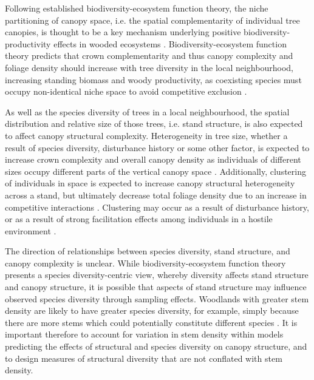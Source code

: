 \documentclass[11pt,a4paper]{article}
\begin{document}
Following established biodiversity-ecosystem function theory, the niche partitioning of canopy space, i.e. the spatial complementarity of individual tree canopies, is thought to be a key mechanism underlying positive biodiversity-productivity effects in wooded ecosystems \citep{Pretzsch2014, Barry2019}. Biodiversity-ecosystem function theory predicts that crown complementarity and thus canopy complexity and foliage density should increase with tree diversity in the local neighbourhood, increasing standing biomass and woody productivity, as coexisting species must occupy non-identical niche space to avoid competitive exclusion \citep{}. 

As well as the species diversity of trees in a local neighbourhood, the spatial distribution and relative size of those trees, i.e. stand structure, is also expected to affect canopy structural complexity. Heterogeneity in tree size, whether a result of species diversity, disturbance history or some other factor, is expected to increase crown complexity and overall canopy density as individuals of different sizes occupy different parts of the vertical canopy space \citep{}. Additionally, clustering of individuals in space is expected to increase canopy structural heterogeneity across a stand, but ultimately decrease total foliage density due to an increase in competitive interactions \citep{}. Clustering may occur as a result of disturbance history, or as a result of strong facilitation effects among individuals in a hostile environment \citep{Ratcliffe2017}.

The direction of relationships between species diversity, stand structure, and canopy complexity is unclear. While biodiversity-ecosystem function theory presents a species diversity-centric view, whereby diversity affects stand structure and canopy structure, it is possible that aspects of stand structure may influence observed species diversity through sampling effects. Woodlands with greater stem density are likely to have greater species diversity, for example, simply because there are more stems which could potentially constitute different species \citep{}. It is important therefore to account for variation in stem density within models predicting the effects of structural and species diversity on canopy structure, and to design measures of structural diversity that are not conflated with stem density.
\end{document}
